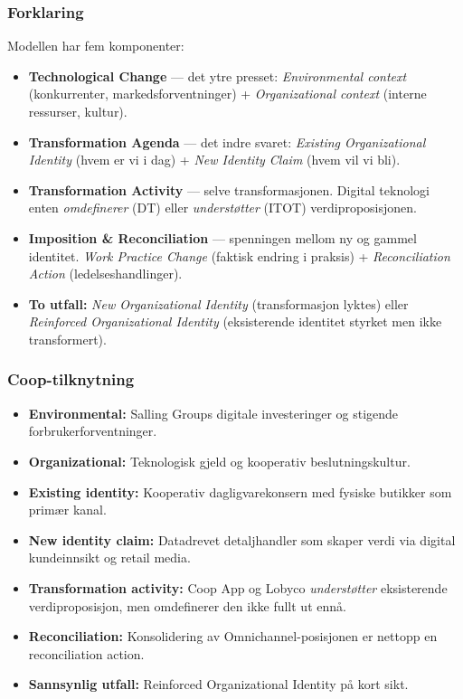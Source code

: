 \subsubsection*{Forklaring}
Modellen har fem komponenter:
\begin{itemize}
  \item \textbf{Technological Change} --- det ytre presset:
    \emph{Environmental context} (konkurrenter, markedsforventninger) +
    \emph{Organizational context} (interne ressurser, kultur).
  \item \textbf{Transformation Agenda} --- det indre svaret:
    \emph{Existing Organizational Identity} (hvem er vi i dag) +
    \emph{New Identity Claim} (hvem vil vi bli).
  \item \textbf{Transformation Activity} --- selve transformasjonen.
    Digital teknologi enten \emph{omdefinerer} (DT) eller
    \emph{understøtter} (ITOT) verdiproposisjonen.
  \item \textbf{Imposition \& Reconciliation} --- spenningen mellom ny
    og gammel identitet. \emph{Work Practice Change} (faktisk endring i
    praksis) + \emph{Reconciliation Action} (ledelseshandlinger).
  \item \textbf{To utfall:} \emph{New Organizational Identity}
    (transformasjon lyktes) eller \emph{Reinforced Organizational
    Identity} (eksisterende identitet styrket men ikke transformert).
\end{itemize}

\subsubsection*{Coop-tilknytning}
\begin{itemize}
  \item \textbf{Environmental:} Salling Groups digitale investeringer og
    stigende forbrukerforventninger.
  \item \textbf{Organizational:} Teknologisk gjeld og kooperativ
    beslutningskultur.
  \item \textbf{Existing identity:} Kooperativ dagligvarekonsern med
    fysiske butikker som primær kanal.
  \item \textbf{New identity claim:} Datadrevet detaljhandler som
    skaper verdi via digital kundeinnsikt og retail media.
  \item \textbf{Transformation activity:} Coop App og Lobyco
    \emph{understøtter} eksisterende verdiproposisjon, men omdefinerer
    den ikke fullt ut ennå.
  \item \textbf{Reconciliation:} Konsolidering av Omnichannel-posisjonen
    er nettopp en reconciliation action.
  \item \textbf{Sannsynlig utfall:} Reinforced Organizational Identity
    på kort sikt.
\end{itemize}

